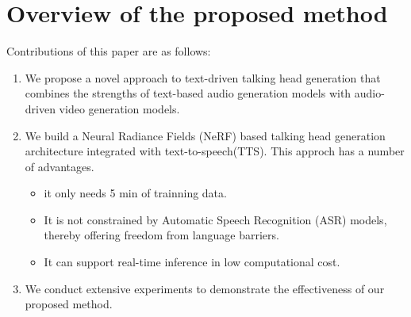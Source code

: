 \section{Overview of the proposed method}
\label{sec:overview} 
Contributions of this paper are as follows:
\begin{enumerate}
    \item We propose a novel approach to text-driven talking head generation that combines the strengths of text-based audio generation models with audio-driven video generation models.
    \item We build a Neural Radiance Fields (NeRF) based talking head generation architecture integrated with text-to-speech(TTS). This approch has a number of advantages.
    \begin{itemize}
        \item it only needs 5 min of trainning data.
        \item It is not constrained by Automatic Speech Recognition (ASR) models, thereby offering freedom from language barriers.
        \item It can support real-time inference in low computational cost.
    \end{itemize}
    \item We conduct extensive experiments to demonstrate the effectiveness of our proposed method.
\end{enumerate}